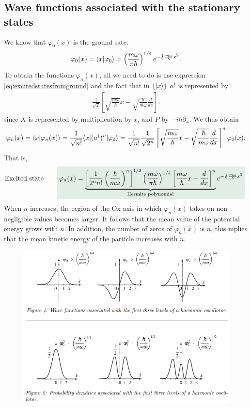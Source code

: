 \subsection{Wave functions associated with the stationary states}
We know that $\varphi_0(x)$ is the ground sate:
\begin{align*}
    \varphi_0(x)=\langle x|\varphi_0\rangle=\left(\frac{m\omega}{\pi\hbar}\right)^{1/4}e^{-\frac{1}{2}\frac{m\omega}{\hbar}x^2}.
\end{align*}
To obtain the functions $\varphi_n(x)$, all we need to do is use expression \eqref{eq:excitedstatesfromground} and the fact that in $\{|x\rangle\}$ $a^\dagger$ is represented by 
\begin{align}
    \frac{1}{\sqrt{2}}\left[\sqrt{\frac{m\omega}{\hbar}}x-\sqrt{\frac{\hbar}{m\omega}}\frac{d}{dx}\right].
\end{align}
since $X$ is represented by multiplication by $x$, and $P$ by $-i\hbar\partial_x$. We thus obtain
\begin{align}
    \varphi_n(x)=\langle x|\varphi_n(x)\rangle=\frac{1}{\sqrt{n!}}\langle x|(a^\dagger)^n|\varphi_0\rangle=\frac{1}{\sqrt{n!}}\frac{1}{\sqrt{2^n}}\left[\sqrt{\frac{m\omega}{\hbar}}x-\sqrt{\frac{\hbar}{m\omega}}\frac{d}{dx}\right]^n\varphi_0(x).
\end{align}
That is, 
\begin{align}
    \text{Excited state}\qquad\highlight{\varphi_n(x)=\underbrace{\left[\frac{1}{2^nn!}\left(\frac{\hbar}{m\omega}\right)^n\right]^{1/2}\left(\frac{m\omega}{\pi\hbar}\right)^{1/4}\left[\frac{m\omega}{\hbar}x-\frac{d}{dx}\right]^n}_{\text{Hermite polynomial}}e^{-\frac{1}{2}\frac{m\omega}{\hbar}x^2}}.
\end{align}
When $n$ increases, the region of the Ox axis in which $\varphi_n(x)$ takes on non-negligible values becomes larger. It follows that the mean value of the potential 
energy grows with $n$. In addition, the number of zeros of $\varphi_n(x)$ is $n$, this mplies that the mean kinetic energy of the particle increases with $n$.
\begin{figure}[h!]
    \centering
    \includegraphics[width=.7\columnwidth]{PartOne/ChapterThree/excitedstatesqho.png}
\end{figure}


